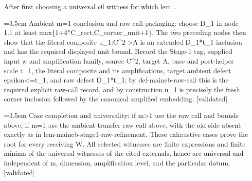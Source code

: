 \documentclass{article}
\newcommand{\step}[1]{\par\noindent\hangindent=3.5em\hangafter=1%
  \makebox[3.5em][l]{\textbf{#1.}}}
\newcommand{\steptag}[1]{\hfill{\small\textsf{[#1]}}}
\begin{document}
\begin{proofbox}{After first choosing a universal c0 witness for which lem...}
\step{1.6.3} Ambient m=1 conclusion and raw-call packaging: choose D\_1 in node 1.1 at least max\{1+4*C\_rect,C\_corner\_unit+1\}. The two preceding nodes then show that the literal composite u\_1:C\textasciicircum{}2->A is an extended D\_1*t\_1-inclusion and has the required displayed unit bound. Record the Stage-1 tag, supplied input w and amplification family, source C\textasciicircum{}2, target A, base and post-helper scale t\_1, the literal composite and its amplifications, target ambient defect epsilon<=t\_1, and raw defect D\_1*t\_1; by def-maincb-raw-call this is the required explicit raw-call record, and by construction u\_1 is precisely the fresh corner inclusion followed by the canonical amplified embedding. \steptag{validated} \\[4pt]
\step{1.7} Case completion and universality: if m>1 use the raw call and bounds above; if m=1 use the ambient-transfer raw call above, with the old side absent exactly as in lem-maincb-stage1-raw-refinement. These exhaustive cases prove the root for every receiving W. All selected witnesses are finite expressions and finite minima of the universal witnesses of the cited externals, hence are universal and independent of m, dimension, amplification level, and the particular datum. \steptag{validated} \\[4pt]
\end{proofbox}
\end{document}
